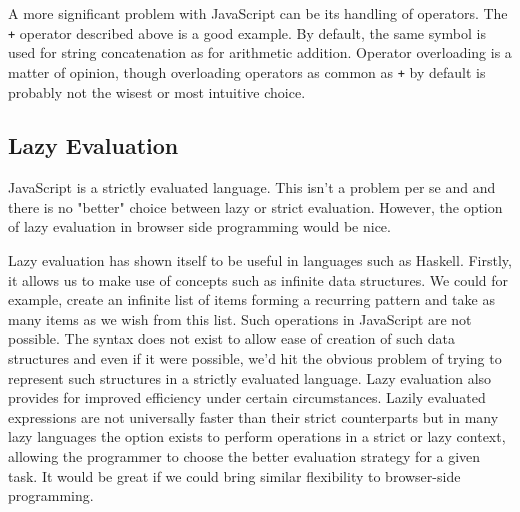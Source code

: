 A more significant problem with JavaScript can be its handling of
operators. The \verb!+! operator described above is a good
example. By default, the same symbol is used for string concatenation
as for arithmetic addition. Operator overloading is a matter of opinion,
though overloading operators as common as \verb!+! by default is probably
not the wisest or most intuitive choice. 

\subsection{Lazy Evaluation}
JavaScript is a strictly evaluated language. This isn't a problem per
se and and there is no "better" choice between lazy or strict evaluation.
However, the option of lazy evaluation in browser side programming would
be nice. 

Lazy evaluation has shown itself to be useful in languages such as
Haskell. Firstly, it allows us to make use of concepts such as infinite
data structures. We could for example, create an infinite list of items
forming a recurring pattern and take as many items as we wish from this
list. Such operations in JavaScript are not possible. The syntax does
not exist to allow ease of creation of such data structures and even if
it were possible, we'd hit the obvious problem of trying to represent
such structures in a strictly evaluated language. Lazy evaluation also
provides for improved efficiency under certain circumstances. Lazily
evaluated expressions are not universally faster than their strict
counterparts but in many lazy languages the option exists to perform
operations in a strict or lazy context, allowing the programmer to choose
the better evaluation strategy for a given task. It would be great if
we could bring similar flexibility to browser-side programming.



